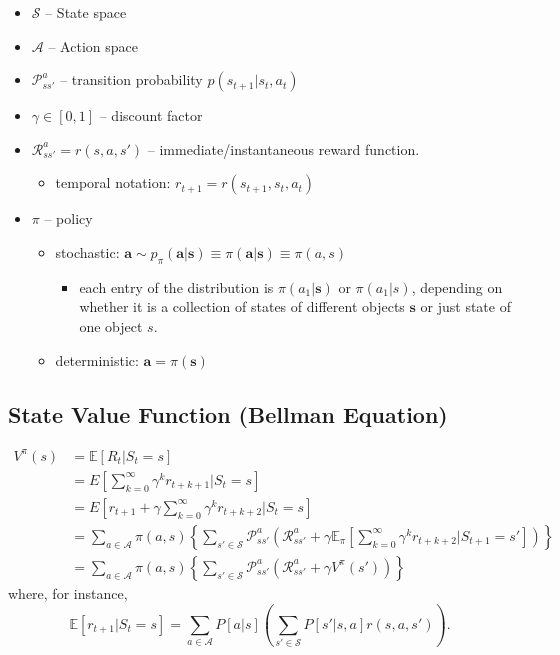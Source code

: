 \documentclass[twocolumn,landscape,10pt]{article}
\theoremstyle{definition}
\begin{document}
\begin{itemize}
    \item $\mathcal{S}$ -- State space
    \item $\mathcal{A}$ -- Action space
    \item $\mathcal{P}_{ss'}^{a}$ -- transition probability $p(s_{t+1}|s_t,a_t)$
    \item $\gamma\in[0,1]$ -- discount factor
    \item $\mathcal{R}_{ss'}^{a}=r(s,a,s')$ -- immediate/instantaneous reward
        function.
        \begin{itemize}
            \item temporal notation: $r_{t+1}=r(s_{t+1},s_t,a_t)$
        \end{itemize}
    \item $\pi$ -- policy
        \begin{itemize}
            \item stochastic: $\mathbf{a}\sim p_\pi(\mathbf{a}|\mathbf{s})
                \equiv \pi(\mathbf{a}|\mathbf{s}) \equiv \pi(a,s)$
                \begin{itemize}
                    \item each entry of the distribution is $\pi(a_1|\mathbf{s})$
                        or $\pi(a_1|s)$, depending on whether it is a collection
                        of states of different objects $\mathbf{s}$ or just
                        state of one object $s$.
                \end{itemize}
            \item deterministic: $\mathbf{a}=\pi(\mathbf{s})$
        \end{itemize}
\end{itemize}

\subsection{State Value Function (Bellman Equation)}

\begin{align*}
    V^{\pi}(s)
    &= \mathbb{E}[R_t|S_t=s] \\
    &= E\left[\sum_{k=0}^{\infty}\gamma^{k}r_{t+k+1}|S_t=s\right] \\
    &= E\left[r_{t+1}+\gamma\sum_{k=0}^{\infty}\gamma^{k}r_{t+k+2}|S_t=s\right] \\
    &=
    \sum_{a\in\mathcal{A}}\pi(a,s)\left\{\sum_{s'\in\mathcal{S}}\mathcal{P}_{ss'}^a\left(
    \mathcal{R}_{ss'}^a+\gamma\mathbb{E}_\pi\left[
\sum_{k=0}^{\infty}\gamma^{k}r_{t+k+2}|S_{t+1}=s'\right]\right)\right\} \\
    &=
    \sum_{a\in\mathcal{A}}\pi(a,s)\left\{\sum_{s'\in\mathcal{S}}\mathcal{P}_{ss'}^a\left(
    \mathcal{R}_{ss'}^a+\gamma V^\pi(s')\right)\right\}
\end{align*}
where, for instance,
\[
    \mathbb{E}[r_{t+1}|S_t=s]=\sum_{a\in\mathcal{A}}P[a|s]\left(\sum_{s'\in\mathcal{S}}P[s'|s,a]r(s,a,s')\right).
\]
\end{document}

